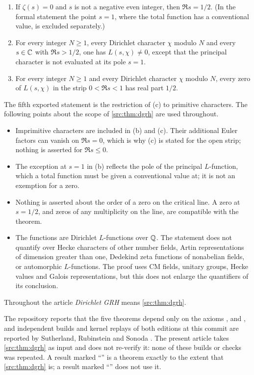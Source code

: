 \begin{theorem}\label{src:thm:dgrh}
\leavevmode
\begin{enumerate}[label=\textup{(\alph*)}]
\item If $\zeta(s)=0$ and $s$ is not a negative even integer, then $\Re s=1/2$. (In the
formal statement the point $s=1$, where the total function has a conventional value, is
excluded separately.)
\item For every integer $N\ge1$, every Dirichlet character $\chi$ modulo $N$ and every
$s\in\mathbb{C}$ with $\Re s>1/2$, one has $L(s,\chi)\ne0$, except that the principal character is
not evaluated at its pole $s=1$.
\item For every integer $N\ge1$ and every Dirichlet character $\chi$ modulo $N$, every zero
of $L(s,\chi)$ in the strip $0<\Re s<1$ has real part $1/2$.
\end{enumerate}
\end{theorem}

The fifth exported statement is the restriction of (c) to primitive characters. The following
points about the scope of \cref{src:thm:dgrh} are used throughout.
\begin{itemize}
\item Imprimitive characters are included in (b) and (c). Their additional Euler factors can
vanish on $\Re s=0$, which is why (c) is stated for the open strip; nothing is asserted for
$\Re s\le0$.
\item The exception at $s=1$ in (b) reflects the pole of the principal $L$-function, which a
total function must be given a conventional value at; it is not an exemption for a zero.
\item Nothing is asserted about the order of a zero on the critical line. A zero at $s=1/2$,
and zeros of any multiplicity on the line, are compatible with the theorem.
\item The functions are Dirichlet $L$-functions over $\mathbb{Q}$. The statement does not quantify
over Hecke characters of other number fields, Artin representations of dimension greater
than one, Dedekind zeta functions of nonabelian fields, or automorphic $L$-functions. The
proof uses CM fields, unitary groups, Hecke values and Galois representations, but this does
not enlarge the quantifiers of its conclusion.
\end{itemize}
Throughout the article \emph{Dirichlet GRH} means \cref{src:thm:dgrh}.

The repository reports that the five theorems depend only on the axioms ,
 and , and independent builds and kernel replays of
both editions at this commit are reported by Sutherland, Rubinstein and Sonoda
\cite{Sutherland2026Verification,Rubinstein2026Check,Sonoda2026Build}. The present article
takes \cref{src:thm:dgrh} as input and does not re-verify it: none of these builds or checks
was repeated. A result marked ``\stG'' is a theorem exactly to the extent that
\cref{src:thm:dgrh} is; a result marked ``\stU'' does not use it.


